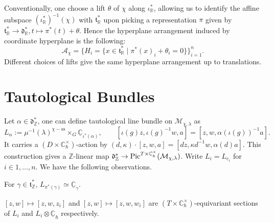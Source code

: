 \documentclass[b5paper]{article}
\newcommand{\MM}{\mathcal{M}}
\newcommand{\sstab}{\mathrm{ss}}
\newcommand{\Chbar}{\mathbb{C}^\times _\hbar}
\begin{document}
Conventionally, one choose a lift $\theta$ of $\chi$ along $\iota_\mathbb{R}^*$, allowing us to identify the affine subspace $(\iota_{\mathbb{R}}^*)^{-1}(\chi)$ with $\mathfrak{t}_\mathbb{R}^*$ upon picking a representation $\pi$ given by $\mathfrak{t}^*_\mathbb{R}\rightarrow \mathfrak{d}_\mathbb{R}^*, t\mapsto \pi^*(t)+\theta$. Hence the hyperplane arrangement induced by coordinate hyperplane is the following:
\begin{equation*}
    \mathcal{A}_\chi = \{ H_i = \{ x \in \mathfrak{t}_{\mathbb{R}}^* \mid \pi^*(x)_i + \theta_i = 0\} \}_{i=1}^n.
\end{equation*}
Different choices of lifts give the same hyperplane arrangement up to translations.

\section{Tautological Bundles}

Let $\alpha\in \mathfrak{d}^*_\mathbb{Z}$, one can define tautological line bundle on $\MM_{\chi,\lambda}$ as 
\[
    L_\alpha:=\mu^{-1}(\lambda)^{\chi-\sstab}\times_G\underline{\mathbb{C}}_{\iota^*(\alpha)},\qquad 
\left[\iota(g)z,\iota(g)^{-1}w,a\right]=\left[z,w,\alpha(\iota(g))^{-1}a\right].
\]
It carries a $(D\times \Chbar)$-action by $(d,\kappa)\cdot [z,w,a]=\left[dz,\kappa d^{-1}w,\alpha(d)a\right]$.
This construction gives a $\mathbb{Z}$-linear map $\mathfrak{d}^*_\mathbb{Z}\rightarrow \textnormal{Pic}^{T\times \Chbar}(\MM_{\chi,\lambda})$. Write $L_i=L_{e_i}$ for $i\in 1,\dots ,n$.
We have the following observations.
\begin{proposition}[pps:]{}
    For $\gamma\in \mathfrak{t}^*_\mathbb{Z}$, $L_{\pi^*(\gamma)}\simeq \underline{\mathbb{C}}_{\gamma}$.
\end{proposition}

\begin{proposition}[pps:]{}
    $[z,w]\mapsto [z,w,z_i]$ and $[z,w]\mapsto [z,w,w_i]$ are $(T\times \Chbar)$-equivariant sections of $L_i$ and $L_i\otimes\underline{\mathbb{C}}_{\hbar}$ respectively.
\end{proposition}
\end{document}
